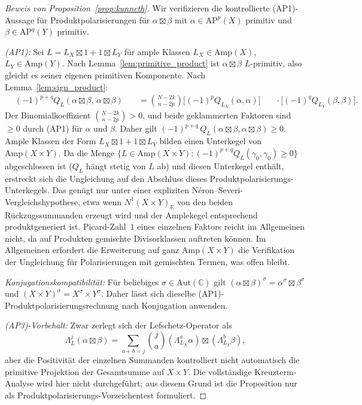 \documentclass[aps,prd,twocolumn,superscriptaddress,nofootinbib]{revtex4-2}
\theoremstyle{definition}
\theoremstyle{remark}
\def\\{ }%
\begin{document}
\begin{proof}[Beweis von Proposition~\ref{prop:kunneth}]
Wir verifizieren die kontrollierte (AP1)-Aussage für Produktpolarisierungen für $\alpha \boxtimes \beta$ mit $\alpha \in \mathrm{AP}^p(X)$ primitiv und $\beta \in \mathrm{AP}^q(Y)$ primitiv.

\textit{(AP1):} Sei $L = L_X \boxtimes 1 + 1 \boxtimes L_Y$ für ample Klassen $L_X \in \mathrm{Amp}(X)$, $L_Y \in \mathrm{Amp}(Y)$. Nach Lemma~\ref{lem:primitive_product} ist $\alpha \boxtimes \beta$ $L$-primitiv, also gleicht es seiner eigenen primitiven Komponente. Nach Lemma~\ref{lem:sign_product}:
\[
\begin{aligned}
&(-1)^{p+q} Q_L(\alpha \boxtimes \beta,\, \alpha \boxtimes \beta)\\
&\quad= \binom{N-2k}{n-2p}
   \bigl[(-1)^p Q_{L_X}(\alpha, \alpha)\bigr]\\
&\quad\cdot \bigl[(-1)^q Q_{L_Y}(\beta, \beta)\bigr].
\end{aligned}
\]
Der Binomialkoeffizient $\binom{N-2k}{n-2p} > 0$, und beide geklammerten Faktoren sind $\geq 0$ durch (AP1) für $\alpha$ und $\beta$. Daher gilt $(-1)^{p+q}\, Q_L(\alpha \boxtimes \beta, \alpha \boxtimes \beta) \geq 0$. Ample Klassen der Form $L_X \boxtimes 1 + 1 \boxtimes L_Y$ bilden einen Unterkegel von $\mathrm{Amp}(X \times Y)$. Da die Menge $\{L \in \overline{\mathrm{Amp}}(X \times Y) : (-1)^{p+q} Q_L(\gamma_0, \gamma_0) \geq 0\}$ abgeschlossen ist ($Q_L$ hängt stetig von $L$ ab) und diesen Unterkegel enthält, erstreckt sich die Ungleichung auf den Abschluss dieses Produktpolarisierungs-Unterkegels. Das genügt nur unter einer expliziten Néron--Severi-Vergleichshypothese, etwa wenn $N^1(X\times Y)_\mathbb{R}$ von den beiden Rückzugssummanden erzeugt wird und der Amplekegel entsprechend produktgeneriert ist. Picard-Zahl~$1$ eines einzelnen Faktors reicht im Allgemeinen nicht, da auf Produkten gemischte Divisorklassen auftreten können. Im Allgemeinen erfordert die Erweiterung auf ganz $\mathrm{Amp}(X \times Y)$ die Verifikation der Ungleichung für Polarisierungen mit gemischten Termen, was offen bleibt.

\textit{Konjugationskompatibilität:} Für beliebiges $\sigma \in \mathrm{Aut}(\mathbb{C})$ gilt $(\alpha \boxtimes \beta)^\sigma = \alpha^\sigma \boxtimes \beta^\sigma$ und $(X \times Y)^\sigma = X^\sigma \times Y^\sigma$. Daher lässt sich dieselbe (AP1)-Produktpolarisierungsrechnung nach Konjugation anwenden.

\textit{(AP3)-Vorbehalt:} Zwar zerlegt sich der Lefschetz-Operator als
\[
\Lambda_L^j(\alpha \boxtimes \beta) = \sum_{a+b=j} \binom{j}{a}(\Lambda_{L_X}^a \alpha)\boxtimes(\Lambda_{L_Y}^b \beta),
\]
aber die Positivität der einzelnen Summanden kontrolliert nicht automatisch die primitive Projektion der Gesamtsumme auf $X\times Y$. Die vollständige Kreuzterm-Analyse wird hier nicht durchgeführt; aus diesem Grund ist die Proposition nur als Produktpolarisierungs-Vorzeichentest formuliert.
\end{proof}
\end{document}
